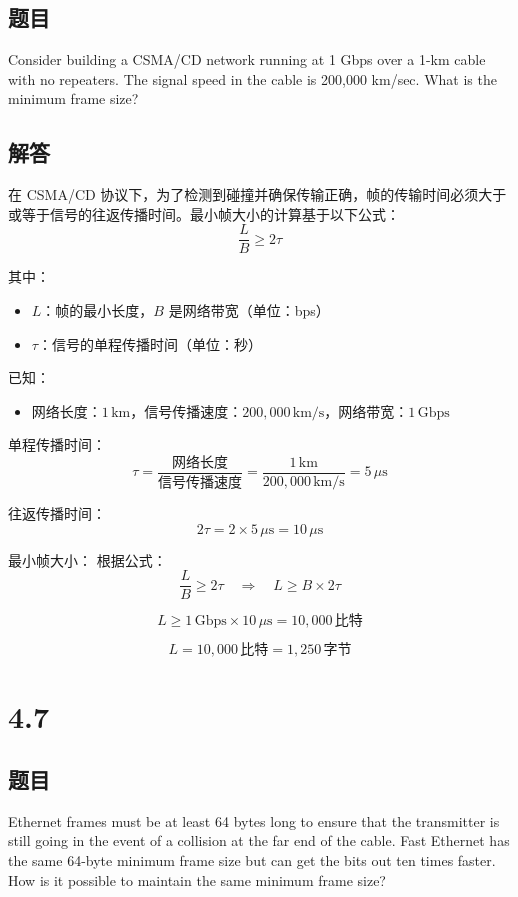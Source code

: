 \subsection*{题目}
Consider building a CSMA/CD network running at 1 Gbps over a 1-km cable with no repeaters. The signal speed in the cable is 200,000 km/sec. What is the minimum frame size?

\subsection*{解答}

在 CSMA/CD 协议下，为了检测到碰撞并确保传输正确，帧的传输时间必须大于或等于信号的往返传播时间。最小帧大小的计算基于以下公式：
\[
\frac{L}{B} \geq 2\tau
\]

其中：
\begin{itemize}
    \item \(L\)：帧的最小长度，\(B\) 是网络带宽（单位：bps）
    \item \(\tau\)：信号的单程传播时间（单位：秒）
\end{itemize}

已知：
\begin{itemize}
    \item 网络长度：\(1 \, \text{km}\)，信号传播速度：\(200,000 \, \text{km/s}\)，网络带宽：\(1 \, \text{Gbps}\)
\end{itemize}


单程传播时间：
\[
\tau = \frac{\text{网络长度}}{\text{信号传播速度}} = \frac{1 \, \text{km}}{200,000 \, \text{km/s}} = 5 \, \mu\text{s}
\]

往返传播时间：
\[
2\tau = 2 \times 5 \, \mu\text{s} = 10 \, \mu\text{s}
\]

最小帧大小：
根据公式：
\[
\frac{L}{B} \geq 2\tau \quad \Rightarrow \quad L \geq B \times 2\tau
\]

\[
L \geq 1 \, \text{Gbps} \times 10 \, \mu\text{s} = 10,000 \, \text{比特}
\]

\[
L = 10,000 \, \text{比特} = 1,250 \, \text{字节}
\]

\section{4.7}

\subsection*{题目}
Ethernet frames must be at least 64 bytes long to ensure that the transmitter is still going in the event of a collision at the far end of the cable. Fast Ethernet has the same 64-byte minimum frame size but can get the bits out ten times faster. How is it possible to maintain the same minimum frame size?

